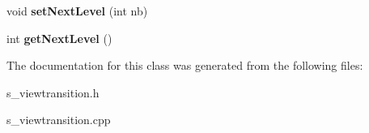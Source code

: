 \begin{DoxyCompactItemize}
\item 
\hypertarget{class_s___view_transition_a7aa555ea153a02bc957cce590c7f0660}{}void {\bfseries set\+Next\+Level} (int nb)\label{class_s___view_transition_a7aa555ea153a02bc957cce590c7f0660}

\item 
\hypertarget{class_s___view_transition_aef44e5819f80ec0689175510a7d50c37}{}int {\bfseries get\+Next\+Level} ()\label{class_s___view_transition_aef44e5819f80ec0689175510a7d50c37}

\end{DoxyCompactItemize}


The documentation for this class was generated from the following files\+:\begin{DoxyCompactItemize}
\item 
s\+\_\+viewtransition.\+h\item 
s\+\_\+viewtransition.\+cpp\end{DoxyCompactItemize}
